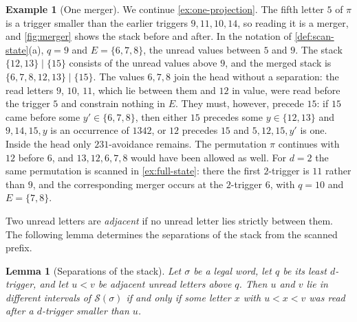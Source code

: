 \documentclass[11pt,reqno]{amsart}
\newtheorem{lemma}[lemma]{Lemma}
\theoremstyle{definition}
\newtheorem{example}[example]{Example}
\theoremstyle{remark}
\begin{document}
\begin{example}[One merger]\label{ex:one-merger}
We continue \cref{ex:one-projection}.  The fifth letter $5$ of $\pi$ is a
trigger smaller than the earlier triggers $9,11,10,14$, so reading it is a
merger, and \cref{fig:merger} shows the stack before and after.  In the
notation of \cref{def:scan-state}(a), $q=9$ and $E=\{6,7,8\}$, the unread
values between $5$ and $9$.  The stack $\{12,13\}\mid\{15\}$ consists of the
unread values above $9$, and the merged stack is
$\{6,7,8,12,13\}\mid\{15\}$.
The values $6,7,8$ join the head without a separation: the read letters
$9$, $10$, $11$, which lie between them and $12$ in value, were read before
the trigger $5$ and constrain nothing in $E$.  They must, however, precede
$15$: if $15$ came before some $y'\in\{6,7,8\}$, then either $15$
precedes some $y\in\{12,13\}$ and $9,14,15,y$ is an occurrence of $1342$,
or $12$ precedes $15$ and $5,12,15,y'$ is one.  Inside the head only $231$-avoidance
remains.  The permutation $\pi$ continues with $12$ before $6$, and
$13,12,6,7,8$ would have been allowed as well.  For $d=2$ the same permutation is scanned in
\cref{ex:full-state}: there the first $2$-trigger is $11$ rather than $9$,
and the corresponding merger occurs at the $2$-trigger $6$, with $q=10$ and
$E=\{7,8\}$.
\end{example}

Two unread letters are \emph{adjacent} if no unread letter lies strictly
between them.  The following lemma determines the separations of the stack
from the scanned prefix.

\begin{lemma}[Separations of the stack]\label{lem:separators}
Let $\sigma$ be a legal word, let $q$ be its least $d$-trigger, and let
$u<v$ be adjacent unread letters above $q$.  Then $u$
and $v$ lie in different intervals of $\mathcal S(\sigma)$ if and only if
some letter $x$ with $u<x<v$ was read after a $d$-trigger smaller than $u$.
\end{lemma}
\end{document}
